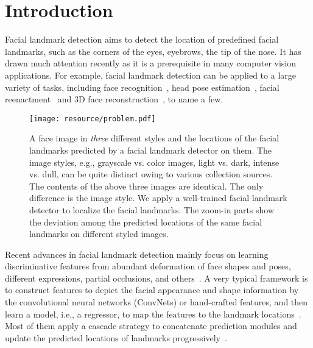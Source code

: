 \documentclass[10pt,twocolumn,letterpaper]{article}
\begin{document}
\section{Introduction}

Facial landmark detection aims to detect the location of predefined facial landmarks, such as the corners of the eyes, eyebrows, the tip of the nose.
It has drawn much attention recently as it is a prerequisite in many computer vision applications.
For example, facial landmark detection can be applied to a large variety of tasks, including face recognition~\cite{zhucvpr2015high,liu2018exploring}, head pose estimation~\cite{wucvpr2017simultaneous}, facial reenactment~\cite{thies2016face2face} and 3D face reconstruction~\cite{liu2016joint}, to name a few.




\begin{figure}[t]
\center
\texttt{[image: resource/problem.pdf]}
\caption{
A face image in \emph{three} different styles and the locations of the facial landmarks predicted by a facial landmark detector on them.
The image styles, e.g., grayscale vs. color images, light vs. dark, intense vs. dull, can be quite distinct owing to various collection sources.
The contents of the above three images are identical. The only difference is the image style.
We apply a well-trained facial landmark detector to localize the facial landmarks.
The zoom-in parts show the deviation among the predicted locations of the same facial landmarks on different styled images.
}
\label{fig:high-level}
\end{figure}



Recent advances in facial landmark detection mainly focus on learning discriminative features from abundant deformation of face shapes and poses, different expressions, partial occlusions, and others~\cite{wucvpr2017simultaneous,zhu2016unconstrained,wucvpr2016constrained,jourabloo2017pose}.
A very typical framework is to construct features to depict the facial appearance and shape information by the convolutional neural networks (ConvNets) or hand-crafted features, and then learn a model, i.e., a regressor, to map the features to the landmark locations~\cite{xiong2013supervised,dollar2010cascaded,cao2014face,ren2014face,zhu2015face,zhang2014coarse,peng2016recurrent}.
Most of them apply a cascade strategy to concatenate prediction modules and update the predicted locations of landmarks progressively~\cite{zhang2014coarse,dollar2010cascaded,zhu2016unconstrained}.
\end{document}
